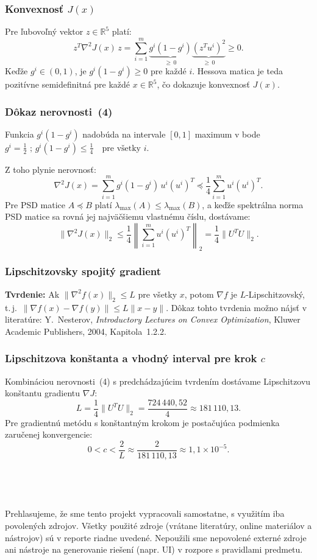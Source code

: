 \documentclass[titlepage]{article}
\begin{document}
\subsubsection*{Konvexnosť $J(x)$}

Pre ľubovoľný vektor $z \in \mathbb{R}^5$ platí:
\[
z^T \nabla^2 J(x)\, z
= \sum_{i=1}^{m} \underbrace{g^i(1-g^i)}_{\geq\, 0} \underbrace{(z^T u^i)^2}_{\geq\, 0} \geq 0.
\]
Keďže $g^i \in (0,1)$, je $g^i(1-g^i) \geq 0$ pre každé $i$. Hessova matica je teda pozitívne semidefinitná pre každé $x \in \mathbb{R}^5$, čo dokazuje konvexnosť $J(x)$.

\subsubsection*{Dôkaz nerovnosti~(4)}

Funkcia $g^i(1-g^i)$ nadobúda na intervale $[0,1]$ maximum v bode $g^i = \tfrac{1}{2} \text{ ;  }g^i(1-g^i) \leq \frac{1}{4} \quad \text{pre všetky } i.$

Z toho plynie nerovnosť:
\[
\nabla^2 J(x)
= \sum_{i=1}^{m} g^i(1-g^i)\, u^i(u^i)^T
\preceq \frac{1}{4} \sum_{i=1}^{m} u^i(u^i)^T.
\]
Pre PSD matice $A \preceq B$ platí $\lambda_{\max}(A) \leq \lambda_{\max}(B)$, a keďže spektrálna norma PSD matice sa rovná jej najväčšiemu vlastnému číslu, dostávame:
\[
\|\nabla^2 J(x)\|_2 \leq \frac{1}{4}\left\|\sum_{i=1}^{m} u^i(u^i)^T\right\|_2 = \frac{1}{4}\|U^T U\|_2.
\]

\subsubsection*{Lipschitzovsky spojitý gradient}

\textbf{Tvrdenie:} Ak $\|\nabla^2 f(x)\|_2 \leq L$ pre všetky $x$, potom $\nabla f$ je $L$-Lipschitzovský, t.\,j.\ $\|\nabla f(x) - \nabla f(y)\| \leq L\|x - y\|$. Dôkaz tohto tvrdenia možno nájsť v literatúre: Y.~Nesterov, \textit{Introductory Lectures on Convex Optimization}, Kluwer Academic Publishers, 2004, Kapitola~1.2.2.

\subsubsection*{Lipschitzova konštanta a vhodný interval pre krok $c$}

Kombináciou nerovnosti~(4) s predchádzajúcim tvrdením dostávame Lipschitzovu konštantu gradientu $\nabla J$:
\[
L = \frac{1}{4}\|U^T U\|_2 = \frac{724\,440{,}52}{4} \approx 181\,110{,}13.
\]
Pre gradientnú metódu s konštantným krokom je postačujúca podmienka zaručenej konvergencie:
\[
0 < c < \frac{2}{L} \approx \frac{2}{181\,110{,}13} \approx 1{,}1 \times 10^{-5}.
\]
\\
\\
\\
\\
Prehlasujeme, že sme tento projekt vypracovali samostatne, s využitím iba povolených zdrojov.
Všetky použité zdroje (vrátane literatúry, online materiálov a nástrojov) sú v reporte riadne
uvedené. Nepoužili sme nepovolené externé zdroje ani nástroje na generovanie riešení (napr.
UI) v rozpore s pravidlami predmetu.
\end{document}
